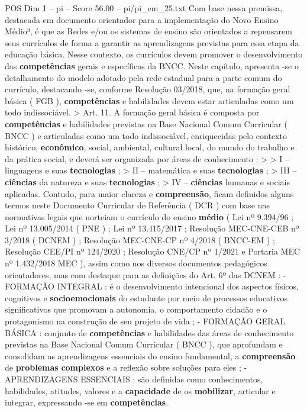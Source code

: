\begin{textsample}{POS Dim 1 – pi – Score 56.00 – pi/pi\_em\_25.txt}
Com base nessa premissa, destacada em documento orientador para a implementação do Novo Ensino Médio³, é que as Redes e/ou os sistemas de ensino são orientados a repensarem seus currículos de forma a garantir as aprendizagens previstas para essa etapa da educação básica.
Nesse contexto, os currículos devem promover o desenvolvimento das \textbf{competências} gerais e específicas da BNCC.
Neste capítulo, apresenta -se o detalhamento do modelo adotado pela rede estadual para a parte comum do currículo, destacando -se, conforme Resolução 03/2018, que, na formação geral básica ( FGB ), \textbf{competências} e habilidades devem estar articuladas como um todo indissociável. > Art. 11.
A formação geral básica é composta por \textbf{competências} e habilidades previstas na Base Nacional Comum Curricular ( BNCC ) e articuladas como um todo indissociável, enriquecidas pelo contexto histórico, \textbf{econômico}, social, ambiental, cultural local, do mundo do trabalho e da prática social, e deverá ser organizada por áreas de conhecimento : > > I – linguagens e suas \textbf{tecnologias} ; > II – matemática e suas \textbf{tecnologias} ; > III – \textbf{ciências} da natureza e suas \textbf{tecnologias} ; > IV – \textbf{ciências} humanas e sociais aplicadas.
Contudo, para maior clareza e \textbf{compreensão}, ficam definidos alguns termos neste Documento Curricular de Referência ( DCR ) com base nas normativas legais que norteiam o currículo do ensino \textbf{médio} ( Lei nº 9.394/96 ; Lei nº 13.005/2014 ( PNE ) ; Lei nº 13.415/2017 ; Resolução MEC-CNE-CEB nº 3/2018 ( DCNEM ) ; Resolução MEC-CNE-CP nº 4/2018 ( BNCC-EM ) ; Resolução CEE/PI nº 124/2020 ; Resolução CNE/CP nº 1/2021 e Portaria MEC nº 1.432/2018 MEC ), assim como nos diversos documentos pedagógicos orientadores, mas com destaque para as definições do Art. 6º das DCNEM : - FORMAÇÃO INTEGRAL : é o desenvolvimento intencional dos aspectos físicos, cognitivos e \textbf{socioemocionais} do estudante por meio de processos educativos significativos que promovam a autonomia, o comportamento cidadão e o protagonismo na construção de seu projeto de vida ; - FORMAÇÃO GERAL BÁSICA : conjunto de \textbf{competências} e habilidades das áreas de conhecimento previstas na Base Nacional Comum Curricular ( BNCC ), que aprofundam e consolidam as aprendizagens essenciais do ensino fundamental, a \textbf{compreensão} de \textbf{problemas} \textbf{complexos} e a reflexão sobre soluções para eles ; - APRENDIZAGENS ESSENCIAIS : são definidas como conhecimentos, habilidades, atitudes, valores e a \textbf{capacidade} de os \textbf{mobilizar}, articular e integrar, expressando -se em \textbf{competências}.

\end{textsample}
